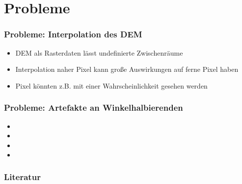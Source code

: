\documentclass{beamer}
\begin{document}
\section{Probleme}

\begin{frame}
  \frametitle{Probleme: Interpolation des DEM~\cite{fisher1993algorithm}}
  \begin{itemize}[<+->]
    \item DEM als Rasterdaten lässt undefinierte Zwischenräume
    \item Interpolation naher Pixel kann große Auswirkungen auf ferne Pixel haben
    \item Pixel könnten z.B. mit einer Wahrscheinlichkeit gesehen werden
  \end{itemize}
\end{frame}

\begin{frame}
  \frametitle{Probleme: Artefakte an Winkelhalbierenden}
  \begin{itemize}[<+->]
    \item 
    \item 
    \item 
    \item 
  \end{itemize}
\end{frame}

\begin{frame}%
  \frametitle{Literatur}
  
  \small
\end{frame}
\end{document}
